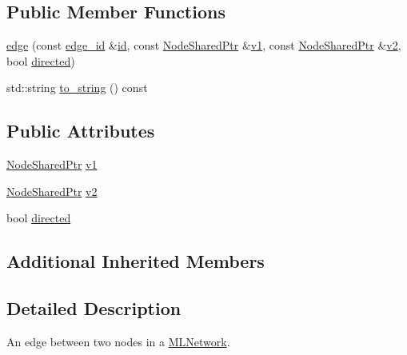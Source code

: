 \subsection*{Public Member Functions}
\begin{DoxyCompactItemize}
\item 
\hyperlink{classmlnet_1_1edge_a1b81e36ac55205d1aca6cbde4679a794}{edge} (const \hyperlink{namespacemlnet_ad708e58e72680351e102e6b3d0489145}{edge\+\_\+id} \&\hyperlink{classmlnet_1_1basic__component_a7d56ea959ef686405bc0fa4830b03347}{id}, const \hyperlink{namespacemlnet_acf8b1b6deb52e7dacfc676c689f9a10c}{Node\+Shared\+Ptr} \&\hyperlink{classmlnet_1_1edge_a5937b3d8aaa623600d68c3389e1bcfbc}{v1}, const \hyperlink{namespacemlnet_acf8b1b6deb52e7dacfc676c689f9a10c}{Node\+Shared\+Ptr} \&\hyperlink{classmlnet_1_1edge_ac9c3f96b25b4f06cf3d2202e8ea661dc}{v2}, bool \hyperlink{classmlnet_1_1edge_a317e58d611d421b7a2472a9b0e47da3b}{directed})
\item 
std\+::string \hyperlink{classmlnet_1_1edge_a070bcf02c3d765f910fbd0eef40d6ff1}{to\+\_\+string} () const 
\end{DoxyCompactItemize}
\subsection*{Public Attributes}
\begin{DoxyCompactItemize}
\item 
\hyperlink{namespacemlnet_acf8b1b6deb52e7dacfc676c689f9a10c}{Node\+Shared\+Ptr} \hyperlink{classmlnet_1_1edge_a5937b3d8aaa623600d68c3389e1bcfbc}{v1}
\item 
\hyperlink{namespacemlnet_acf8b1b6deb52e7dacfc676c689f9a10c}{Node\+Shared\+Ptr} \hyperlink{classmlnet_1_1edge_ac9c3f96b25b4f06cf3d2202e8ea661dc}{v2}
\item 
bool \hyperlink{classmlnet_1_1edge_a317e58d611d421b7a2472a9b0e47da3b}{directed}
\end{DoxyCompactItemize}
\subsection*{Additional Inherited Members}


\subsection{Detailed Description}
An edge between two nodes in a \hyperlink{classmlnet_1_1_m_l_network}{M\+L\+Network}. 

